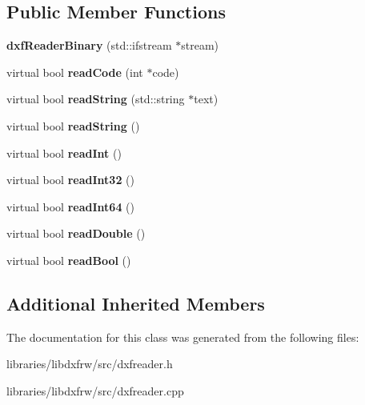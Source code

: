 \subsection*{Public Member Functions}
\begin{DoxyCompactItemize}
\item 
\hypertarget{classdxfReaderBinary_a7e8ac05aeb41873c868bca83f8f19d2e}{{\bfseries dxf\-Reader\-Binary} (std\-::ifstream $\ast$stream)}\label{classdxfReaderBinary_a7e8ac05aeb41873c868bca83f8f19d2e}

\item 
\hypertarget{classdxfReaderBinary_a6a610831a1b59abc384f53501d5f5d83}{virtual bool {\bfseries read\-Code} (int $\ast$code)}\label{classdxfReaderBinary_a6a610831a1b59abc384f53501d5f5d83}

\item 
\hypertarget{classdxfReaderBinary_a6ab7e640f83c042c70551021121e75a0}{virtual bool {\bfseries read\-String} (std\-::string $\ast$text)}\label{classdxfReaderBinary_a6ab7e640f83c042c70551021121e75a0}

\item 
\hypertarget{classdxfReaderBinary_ae3ac59eb3866ba413a65eeefb06370db}{virtual bool {\bfseries read\-String} ()}\label{classdxfReaderBinary_ae3ac59eb3866ba413a65eeefb06370db}

\item 
\hypertarget{classdxfReaderBinary_a4f58ccd9fe6a39ad77b3f564974a7fd2}{virtual bool {\bfseries read\-Int} ()}\label{classdxfReaderBinary_a4f58ccd9fe6a39ad77b3f564974a7fd2}

\item 
\hypertarget{classdxfReaderBinary_a7dca491a39bbc0bd084d97b8701fa2a8}{virtual bool {\bfseries read\-Int32} ()}\label{classdxfReaderBinary_a7dca491a39bbc0bd084d97b8701fa2a8}

\item 
\hypertarget{classdxfReaderBinary_ab9a3a775d30dcf181706717f7a51b652}{virtual bool {\bfseries read\-Int64} ()}\label{classdxfReaderBinary_ab9a3a775d30dcf181706717f7a51b652}

\item 
\hypertarget{classdxfReaderBinary_aa341d24a5c3e324397e2bdfc739b31e9}{virtual bool {\bfseries read\-Double} ()}\label{classdxfReaderBinary_aa341d24a5c3e324397e2bdfc739b31e9}

\item 
\hypertarget{classdxfReaderBinary_af25ea34ee82be2ce60a415dc5607a4bd}{virtual bool {\bfseries read\-Bool} ()}\label{classdxfReaderBinary_af25ea34ee82be2ce60a415dc5607a4bd}

\end{DoxyCompactItemize}
\subsection*{Additional Inherited Members}


The documentation for this class was generated from the following files\-:\begin{DoxyCompactItemize}
\item 
libraries/libdxfrw/src/dxfreader.\-h\item 
libraries/libdxfrw/src/dxfreader.\-cpp\end{DoxyCompactItemize}
